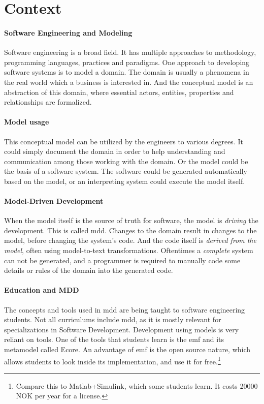 \section{Context}

\paragraph*{Software Engineering and Modeling}
Software engineering is a broad field. It has multiple approaches to methodology, programming languages, practices and paradigms.
One approach to developing software systems is to model a domain.
The domain is usually a phenomena in the real world which a business is interested in. And the conceptual model is an abstraction of this domain, where essential actors, entities, properties and relationships are formalized.

\paragraph*{Model usage}
This conceptual model can be utilized by the engineers to various degrees.
It could simply document the domain in order to help understanding and communication among those working with the domain. Or the model could be the basis of a software system. The software could be generated automatically based on the model, or an interpreting system could execute the model itself.

\paragraph*{Model-Driven Development}
When the model itself is the source of truth for software, the model is \textit{driving} the development. This is called \acrfull{mdd}. Changes to the domain result in changes to the model, before changing the system's code. And the code itself is \textit{derived from the model}, often using model-to-text transformations. Oftentimes a \textit{complete} system can not be generated, and a programmer is required to manually code some details or rules of the domain into the generated code.

\paragraph*{Education and MDD}
The concepts and tools used in \acrshort{mdd} are being taught to software engineering students.
Not all curriculums include \acrshort{mdd}, as it is mostly relevant for specializations in Software Development. %
Development using models is very reliant on tools. One of the tools that students learn is the \acrfull{emf} and its \gls{metamodel} called \gls{Ecore}.
An advantage of \acrshort{emf} is the \gls{open source} nature, which allows students to look inside its implementation, and use it for free.\footnote{Compare this to Matlab+Simulink, which some students learn. It costs 20000 NOK per year for a license.}

